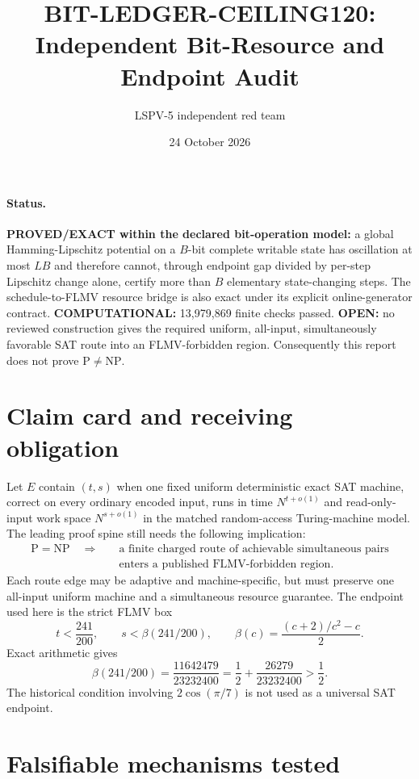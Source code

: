 \documentclass[11pt]{article}
\title{BIT-LEDGER-CEILING120: Independent Bit-Resource and Endpoint Audit}
\author{LSPV-5 independent red team}
\date{24 October 2026}
\begin{document}
\maketitle

\paragraph{Status.}
\textbf{PROVED/EXACT within the declared bit-operation model:} a global Hamming-Lipschitz potential on a $B$-bit complete writable state has oscillation at most $LB$ and therefore cannot, through endpoint gap divided by per-step Lipschitz change alone, certify more than $B$ elementary state-changing steps.  The schedule-to-FLMV resource bridge is also exact under its explicit online-generator contract.  \textbf{COMPUTATIONAL:} 13,979,869 finite checks passed.  \textbf{OPEN:} no reviewed construction gives the required uniform, all-input, simultaneously favorable SAT route into an FLMV-forbidden region.  Consequently this report does not prove $\mathrm P\ne\mathrm{NP}$.

\section{Claim card and receiving obligation}

Let $E$ contain $(t,s)$ when one fixed uniform deterministic exact SAT machine, correct on every ordinary encoded input, runs in time $N^{t+o(1)}$ and read-only-input work space $N^{s+o(1)}$ in the matched random-access Turing-machine model.  The leading proof spine still needs the following implication:
\[
 \begin{aligned}
 \mathrm P=\mathrm{NP}\quad\Longrightarrow\quad
 &\text{a finite charged route of achievable simultaneous pairs}\\
 &\text{enters a published FLMV-forbidden region}.
 \end{aligned}
\]
Each route edge may be adaptive and machine-specific, but must preserve one all-input uniform machine and a simultaneous resource guarantee.  The endpoint used here is the strict FLMV box
\[
 t<\frac{241}{200},\qquad
 s<\beta(241/200),\qquad
 \beta(c)=\frac{(c+2)/c^2-c}{2}.
\]
Exact arithmetic gives
\[
 \beta(241/200)=\frac{11642479}{23232400}
 =\frac12+\frac{26279}{23232400}>\frac12.
\]
The historical condition involving $2\cos(\pi/7)$ is not used as a universal SAT endpoint.

\section{Falsifiable mechanisms tested}
\end{document}
